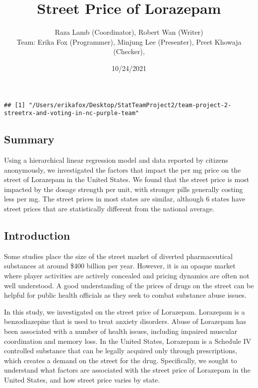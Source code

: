 \documentclass[
]{article}
\title{Street Price of Lorazepam}
\author{Raza Lamb (Coordinator), Robert Wan (Writer)\\
Team: Erika Fox (Programmer), Minjung Lee (Presenter), Preet Khowaja
(Checker),}
\date{10/24/2021}
\begin{document}
\maketitle

\begin{verbatim}
## [1] "/Users/erikafox/Desktop/StatTeamProject2/team-project-2-streetrx-and-voting-in-nc-purple-team"
\end{verbatim}

\hypertarget{summary}{%
\subsection{Summary}\label{summary}}

Using a hierarchical linear regression model and data reported by
citizens anonymously, we investigated the factors that impact the per mg
price on the street of Lorazepam in the United States. We found that the
street price is most impacted by the dosage strength per unit, with
stronger pills generally costing less per mg. The street prices in most
states are similar, although 6 states have street prices that are
statistically different from the national average.

\hypertarget{introduction}{%
\subsection{Introduction}\label{introduction}}

Some studies place the size of the street market of diverted
pharmaceutical substances at around \$400 billion per year. However, it
is an opaque market where player activities are actively concealed and
pricing dynamics are often not well understood. A good understanding of
the prices of drugs on the street can be helpful for public health
officials as they seek to combat substance abuse issues.

In this study, we investigated on the street price of Lorazepam.
Lorazepam is a benzodiazepine that is used to treat anxiety disorders.
Abuse of Lorazepam has been associated with a number of health issues,
including impaired muscular coordination and memory loss. In the United
States, Lorazepam is a Schedule IV controlled substance that can be
legally acquired only through prescriptions, which creates a demand on
the street for the drug. Specifically, we sought to understand what
factors are associated with the street price of Lorazepam in the United
States, and how street price varies by state.
\end{document}
